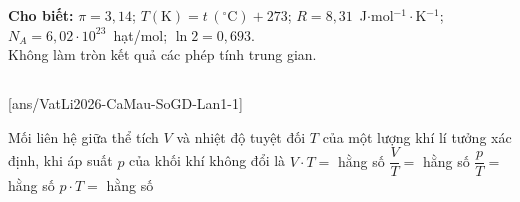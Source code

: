 \def\CheDo{solcolor}%
\def\tenchuong{Sở GD\&ĐT Cà Mau -- Lần 1}
\def\thuonghieu{VẬT LÍ 12 -- Eduzy.com.vn}
\def\TachCauDS{1}
\def\TachCauLG{1}


\newcommand{\CMdongho}[4]{%
	\begin{scope}[shift={(#1,#2)}]
		\fill[gray!55] (0,0) rectangle (#3,#4);
		\shade[top color=white,bottom color=gray!12,draw=gray!70] (0.06,0.06) rectangle (#3-0.06,#4-0.06);
		\draw[black!75] (0.5*#3,0.25*#4)++(135:0.55*#4) arc[start angle=135,end angle=45,radius=0.55*#4];
		\foreach \g in {135,120,...,45}{\draw[black!75,very thin] ($(0.5*#3,0.25*#4)+(\g:0.55*#4)$)--($(0.5*#3,0.25*#4)+(\g:0.64*#4)$);}
		\draw[black!85,thin] (0.5*#3,0.25*#4)--++(100:0.62*#4);
		\fill[black!85] (0.5*#3,0.25*#4) ellipse (0.16*#4 and 0.1*#4);
	\end{scope}}


	\noindent\textbf{Cho biết:} $\pi=3{,}14$; $T(\text{K})=t\,(^\circ\text{C})+273$; $R=8{,}31$~J$\cdot$mol$^{-1}\cdot$K$^{-1}$; $N_A=6{,}02\cdot 10^{23}$~hạt/mol; $\ln 2=0{,}693$.\\
	Không làm tròn kết quả các phép tính trung gian.

	\noindent
	\subsection*{}
	\setcounter{ex}{0}
	[ans/VatLi2026-CaMau-SoGD-Lan1-1]

	\begin{ex}%
		Mối liên hệ giữa thể tích $V$ và nhiệt độ tuyệt đối $T$ của một lượng khí lí tưởng xác định, khi áp suất $p$ của khối khí không đổi là
		\choice
		{$V\cdot T=$ hằng số}
		{\True $\dfrac{V}{T}=$ hằng số}
		{$\dfrac{p}{T}=$ hằng số}
		{$p\cdot T=$ hằng số}
	\end{ex}

